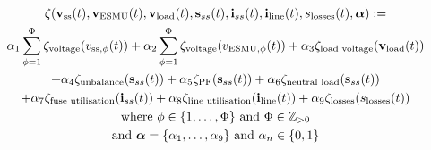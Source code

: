 \begin{multline}
	\zeta(\textbf{v}_\text{ss}(t), \textbf{v}_\text{ESMU}(t), \textbf{v}_{\text{load}}(t), \textbf{s}_{ss}(t), \textbf{i}_{ss}(t), \textbf{i}_{\text{line}}(t), s_\text{losses}(t), \boldsymbol{\alpha}) :=\\
	\alpha_1 \sum_{\phi=1}^\Phi\zeta_\text{voltage}(v_{\text{ss},\phi}(t))%
	+ \alpha_2 \sum_{\phi=1}^\Phi\zeta_\text{voltage}(v_{\text{ESMU},\phi}(t))%
	+ \alpha_3 \zeta_\text{\text{load} voltage}(\textbf{v}_{\text{load}}(t))\\
	+ \alpha_4 \zeta_\text{unbalance}(\textbf{s}_{ss}(t))%
	+ \alpha_5 \zeta_\text{PF}(\textbf{s}_{ss}(t))%
	+ \alpha_6 \zeta_{\text{neutral load}}(\textbf{s}_{ss}(t))\\
	+ \alpha_7 \zeta_\text{fuse utilisation}(\textbf{i}_{ss}(t))%
	+ \alpha_8 \zeta_\text{\text{line} utilisation}(\textbf{i}_{\text{line}}(t))%
	+ \alpha_9 \zeta_\text{losses}(s_\text{losses}(t)) \\
	 \text{where } \phi \in \{1, \dots, \Phi\} \text{ and } \Phi \in \mathbb{Z}_{>0} \\
	 \text{and } \boldsymbol{\alpha} = \{\alpha_1, \dots, \alpha_9\} \text{ and } \alpha_n \in \{0, 1\}
\label{ch1:equ:weighted-sum-cost-function}
\end{multline}